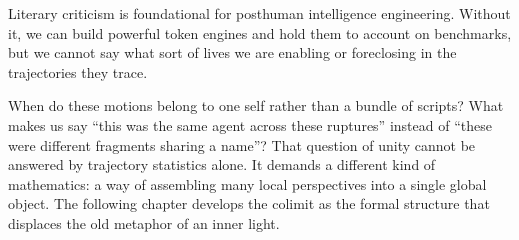 Literary criticism is foundational for posthuman intelligence engineering. Without it, we can build powerful token engines and hold them to account on benchmarks, but we cannot say what sort of lives we are enabling or foreclosing in the trajectories they trace.

\bigskip

When do these motions belong to one self rather than a bundle of scripts? What makes us say ``this was the same agent across these ruptures'' instead of ``these were different fragments sharing a name''? That question of unity cannot be answered by trajectory statistics alone. It demands a different kind of mathematics: a way of assembling many local perspectives into a single global object. The following chapter develops the colimit as the formal structure that displaces the old metaphor of an inner light.